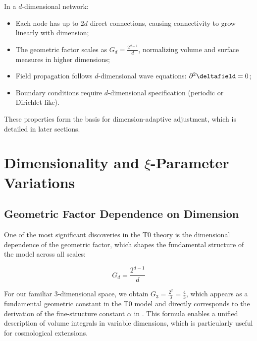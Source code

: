 	\begin{tcolorbox}[colback=blue!5!white,colframe=blue!75!black,title=Dimensional Network Properties,breakable]
		In a $d$-dimensional network:
		\begin{itemize}
			\item Each node has up to $2d$ direct connections, causing connectivity to grow linearly with dimension;
			\item The geometric factor scales as $G_d = \frac{2^{d-1}}{d}$, normalizing volume and surface measures in higher dimensions;
			\item Field propagation follows $d$-dimensional wave equations: $\partial^2 \deltafield = 0$;
			\item Boundary conditions require $d$-dimensional specification (periodic or Dirichlet-like).
		\end{itemize}
	\end{tcolorbox}
	
	These properties form the basis for dimension-adaptive adjustment, which is detailed in later sections.
	
	\section{Dimensionality and $\xi$-Parameter Variations}
	\label{sec:dimensionality_xi}
	
	\subsection{Geometric Factor Dependence on Dimension}
	\label{subsec:geometric_factor}
	
	One of the most significant discoveries in the T0 theory is the dimensional dependence of the geometric factor, which shapes the fundamental structure of the model across all scales:
	
	\begin{equation}
		G_d = \frac{2^{d-1}}{d}
	\end{equation}
	
	For our familiar 3-dimensional space, we obtain $G_3 = \frac{2^2}{3} = \frac{4}{3}$, which appears as a fundamental geometric constant in the T0 model and directly corresponds to the derivation of the fine-structure constant $\alpha$ in \cite{T0_Feinstruktur}. This formula enables a unified description of volume integrals in variable dimensions, which is particularly useful for cosmological extensions.
	

